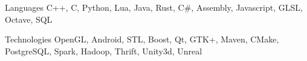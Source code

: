 


\begin{cvskills}


\cvskill
{Languages} %
{C++, C, Python, Lua, Java, Rust, C\#, Assembly, Javascript, GLSL, Octave, SQL } %


\cvskill
{Technologies}
{OpenGL, Android, STL, Boost, Qt, GTK+, Maven, CMake, PostgreSQL, Spark, Hadoop, Thrift, Unity3d, Unreal}



\end{cvskills}
